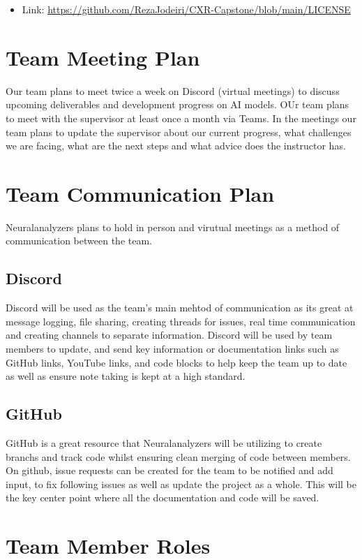 \documentclass{article}
\begin{document}
\begin{itemize}
    \item Link: \url{https://github.com/RezaJodeiri/CXR-Capstone/blob/main/LICENSE}
\end{itemize}

\section{Team Meeting Plan}

Our team plans to meet twice a week on Discord (virtual meetings) to discuss upcoming deliverables and development progress on AI models. 
OUr team plans to meet with the supervisor at least once a month via Teams. In the meetings our team plans to update the supervisor about our current progress, what challenges we are facing, what are the next steps and what advice does the instructor has. 


\section{Team Communication Plan}

Neuralanalyzers plans to hold in person and virutual meetings as a method of communication between the team. 

\subsection{Discord}
Discord will be used as the team's main mehtod of communication as its great at message logging, file sharing, creating threads for issues, real time communication and creating channels to separate information. Discord will be used by team members to update, and send key information or documentation links such as GitHub links, YouTube links, and code blocks to help keep the team up to date as well as ensure note taking is kept at a high standard. 
\subsection{GitHub}
GitHub is a great resource that Neuralanalyzers will be utilizing to create branchs and track code whilst ensuring clean merging of code between members. On github, issue requests can be created for the team to be notified and add input, to fix following issues as well as update the project as a whole. This will be the key center point where all the documentation and code will be saved. 

\section{Team Member Roles}
\end{document}
